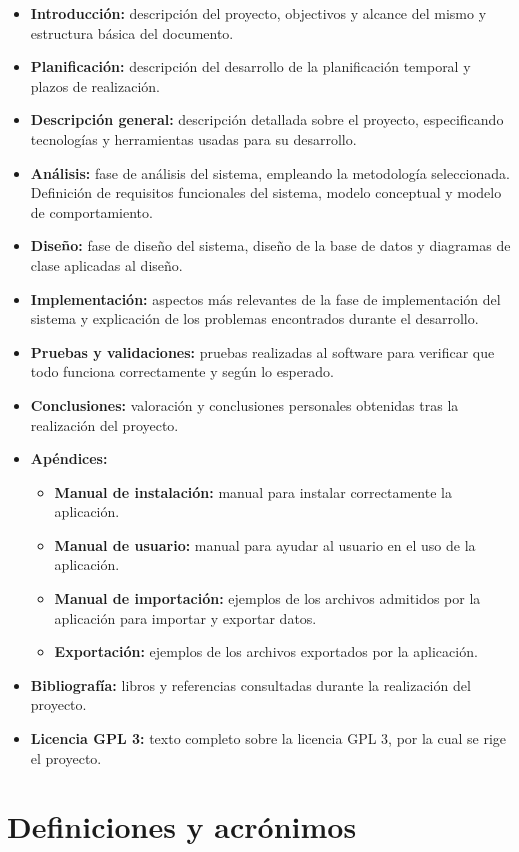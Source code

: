 \begin{itemize}
\item {\bf Introducción:} descripción del proyecto, objectivos y alcance del mismo y estructura básica del documento.
\item {\bf Planificación:} descripción del desarrollo de la planificación temporal y plazos de realización.
\item {\bf Descripción general:} descripción detallada sobre el proyecto, especificando tecnologías y herramientas usadas para su desarrollo.
\item {\bf Análisis:} fase de análisis del sistema, empleando la metodología seleccionada. Definición de requisitos funcionales del sistema, modelo conceptual y modelo de comportamiento.
\item {\bf Diseño:} fase de diseño del sistema, diseño de la base de datos y diagramas de clase aplicadas al diseño.
\item {\bf Implementación:} aspectos más relevantes de la fase de implementación del sistema y explicación de los problemas encontrados durante el desarrollo.
\item {\bf Pruebas y validaciones:} pruebas realizadas al software para verificar que todo funciona correctamente y según lo esperado.
\item {\bf Conclusiones:} valoración y conclusiones personales obtenidas tras la realización del proyecto.
\item {\bf Apéndices:}
\begin{itemize}
\item {\bf Manual de instalación:} manual para instalar correctamente la aplicación.
\item {\bf Manual de usuario:} manual para ayudar al usuario en el uso de la aplicación.
\item {\bf Manual de importación:} ejemplos de los archivos admitidos por la aplicación para importar y exportar datos.
\item {\bf Exportación:} ejemplos de los archivos exportados por la aplicación.
\end{itemize}
\item {\bf Bibliografía:} libros y referencias consultadas durante la realización del proyecto.
\item {\bf Licencia GPL 3:} texto completo sobre la licencia GPL 3, por la cual se rige el proyecto.
\end{itemize}

\section{Definiciones y acrónimos}

